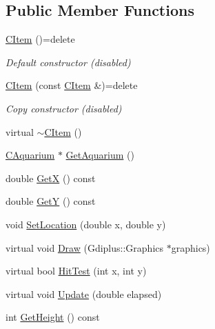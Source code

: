 \subsection*{Public Member Functions}
\begin{DoxyCompactItemize}
\item 
\mbox{\label{class_c_item_ac2ea847c008cf8d1de92c870c8f8262f}} 
\mbox{\hyperlink{class_c_item_ac2ea847c008cf8d1de92c870c8f8262f}{C\+Item}} ()=delete
\begin{DoxyCompactList}\small\item\em Default constructor (disabled) \end{DoxyCompactList}\item 
\mbox{\label{class_c_item_a7d6042bbb9a571d2dc1d1f89016a97c8}} 
\mbox{\hyperlink{class_c_item_a7d6042bbb9a571d2dc1d1f89016a97c8}{C\+Item}} (const \mbox{\hyperlink{class_c_item}{C\+Item}} \&)=delete
\begin{DoxyCompactList}\small\item\em Copy constructor (disabled) \end{DoxyCompactList}\item 
virtual \mbox{\hyperlink{class_c_item_a2487c6e822ed0e850544f1745b43f584}{$\sim$\+C\+Item}} ()
\item 
\mbox{\hyperlink{class_c_aquarium}{C\+Aquarium}} $\ast$ \mbox{\hyperlink{class_c_item_a831327c8bf6c2671cddb0ae4c9339e47}{Get\+Aquarium}} ()
\item 
double \mbox{\hyperlink{class_c_item_a394d38a058fc53f0e958ca52248560c8}{GetX}} () const
\item 
double \mbox{\hyperlink{class_c_item_ac0fe6be80f8ef19854d7f41b4803f658}{GetY}} () const
\item 
void \mbox{\hyperlink{class_c_item_a9c194f3f08e515853600cecca3e6d319}{Set\+Location}} (double x, double y)
\item 
virtual void \mbox{\hyperlink{class_c_item_acfad712746a2da68669c38f5704b3243}{Draw}} (Gdiplus\+::\+Graphics $\ast$graphics)
\item 
virtual bool \mbox{\hyperlink{class_c_item_ab3ffe07990fd2dec1e5cb65ad8ede7a4}{Hit\+Test}} (int x, int y)
\item 
virtual void \mbox{\hyperlink{class_c_item_a0e88df0b5e12a93941dcec378797d0fe}{Update}} (double elapsed)
\item 
int \mbox{\hyperlink{class_c_item_a69392bf15fe717049344f519c8a235d0}{Get\+Height}} () const

\end{DoxyCompactItemize}
